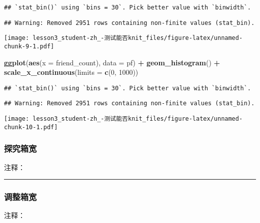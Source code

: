 \documentclass[]{article}
\newenvironment{Shaded}{\begin{snugshade}}{\end{snugshade}}
\newcommand{\DataTypeTok}[1]{\textcolor[rgb]{0.13,0.29,0.53}{#1}}
\newcommand{\DecValTok}[1]{\textcolor[rgb]{0.00,0.00,0.81}{#1}}
\newcommand{\KeywordTok}[1]{\textcolor[rgb]{0.13,0.29,0.53}{\textbf{#1}}}
\newcommand{\NormalTok}[1]{#1}
\newcommand{\OperatorTok}[1]{\textcolor[rgb]{0.81,0.36,0.00}{\textbf{#1}}}
\newcommand{\StringTok}[1]{\textcolor[rgb]{0.31,0.60,0.02}{#1}}
\begin{document}
\begin{verbatim}
## `stat_bin()` using `bins = 30`. Pick better value with `binwidth`.
\end{verbatim}

\begin{verbatim}
## Warning: Removed 2951 rows containing non-finite values (stat_bin).
\end{verbatim}

\texttt{[image: lesson3\_student-zh\_-测试能否knit\_files/figure-latex/unnamed-chunk-9-1.pdf]}

\begin{Shaded}
\begin{Highlighting}[]
\KeywordTok{ggplot}\NormalTok{(}\KeywordTok{aes}\NormalTok{(}\DataTypeTok{x =}\NormalTok{ friend_count), }\DataTypeTok{data =}\NormalTok{ pf) }\OperatorTok{+}\StringTok{ }
\StringTok{  }\KeywordTok{geom_histogram}\NormalTok{() }\OperatorTok{+}\StringTok{ }
\KeywordTok{scale_x_continuous}\NormalTok{(}\DataTypeTok{limits =} \KeywordTok{c}\NormalTok{(}\DecValTok{0}\NormalTok{, }\DecValTok{1000}\NormalTok{))}
\end{Highlighting}
\end{Shaded}

\begin{verbatim}
## `stat_bin()` using `bins = 30`. Pick better value with `binwidth`.
\end{verbatim}

\begin{verbatim}
## Warning: Removed 2951 rows containing non-finite values (stat_bin).
\end{verbatim}

\texttt{[image: lesson3\_student-zh\_-测试能否knit\_files/figure-latex/unnamed-chunk-10-1.pdf]}

\subsubsection{探究箱宽}

注释：

\begin{center}\rule{0.5\linewidth}{\linethickness}\end{center}

\subsubsection{调整箱宽}

注释：
\end{document}
